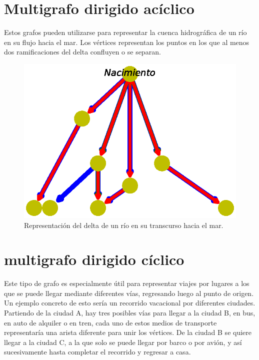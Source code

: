 \documentclass{article}
\begin{document}
\section{Multigrafo dirigido acíclico}

Estos grafos pueden utilizarse para representar la cuenca hidrográfica de un río en su flujo hacia el mar. Los vértices representan los puntos en los que al menos dos ramificaciones del delta confluyen o se separan.


\begin{figure}
  \includegraphics[width=.8\columnwidth]{10.eps}
  \caption{Representación del delta de un río en su transcurso hacia el mar.}
  \label{fig:10}
\end{figure}

\section{multigrafo dirigido cíclico}

Este tipo de grafo es especialmente útil para representar viajes por lugares a los que se puede llegar mediante diferentes vías, regresando luego al punto de origen. Un ejemplo concreto de esto sería un recorrido vacacional por diferentes ciudades. Partiendo de la ciudad A, hay tres posibles vías  para llegar a la ciudad B, en bus, en auto de alquiler o en tren, cada uno de estos medios de transporte representaría una arista diferente para unir los vértices. De la ciudad B se quiere llegar a la ciudad C, a la que solo se puede llegar por barco o por avión, y así sucesivamente hasta completar el recorrido y regresar a casa. 
\end{document}
